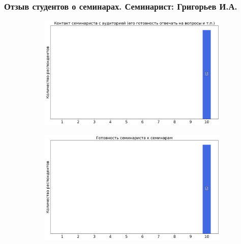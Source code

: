     \subsubsection{Отзыв студентов о семинарах. Семинарист: Григорьев И.А.}
        \begin{figure}[H]
            \centering
            \begin{subfigure}[b]{0.45\textwidth}
                \centering
                \includegraphics[width=\textwidth]{images/4 course/Защита информации/seminarists-marks-Григорьев И.А.-0.png}
            \end{subfigure}
            \begin{subfigure}[b]{0.45\textwidth}
                \centering
                \includegraphics[width=\textwidth]{images/4 course/Защита информации/seminarists-marks-Григорьев И.А.-1.png}
            \end{subfigure}
            \begin{subfigure}[b]{0.45\textwidth}
                \centering

\end{subfigure}
\end{figure}
